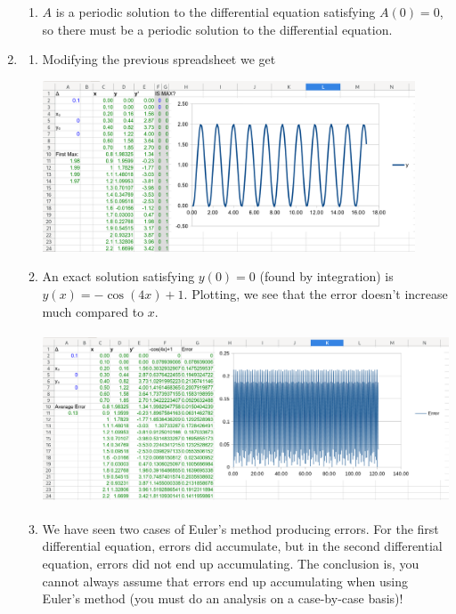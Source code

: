 \begin{enumerate}
\begin{enumerate}
					\item $A$ is a periodic solution to the differential equation satisfying $A(0)=0$, so there must be a periodic solution to
					the differential equation.
			\end{enumerate}
			\item \begin{enumerate}
				\item Modifying the previous spreadsheet we get
					\begin{center}
						\includegraphics[height=2in]{resources/tutorial-01-sheet3a.png}
					\end{center}
				\item An exact solution satisfying $y(0)=0$ (found by integration) is $y(x)=-\cos(4x)+1$.
					Plotting, we see that the error doesn't increase much compared to $x$.
					\begin{center}
						\includegraphics[height=2in]{resources/tutorial-01-sheet3b.png}
					\end{center}
				\item We have seen two cases of Euler's method producing errors. For the first differential equation, errors did accumulate, but in the second
					differential equation, errors did not end up accumulating. The conclusion is, you cannot always assume that errors end up
					accumulating when using Euler's method (you must do an analysis on a case-by-case basis)!

			\end{enumerate}
		\end{enumerate}
